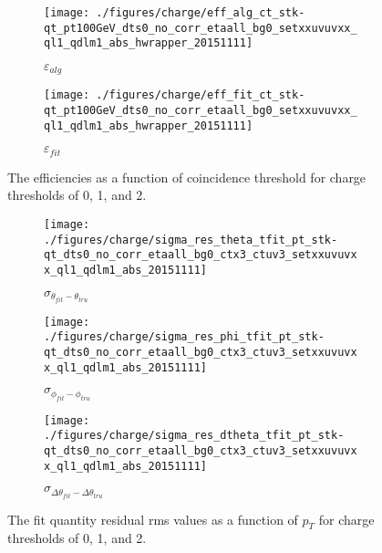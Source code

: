\begin{figure}[!htbp]\captionsetup{justification=centering}
  \begin{center}
    \begin{subfigure}{0.45\textwidth}\caption{$\varepsilon_{alg}$}\texttt{[image: ./figures/charge/eff\_alg\_ct\_stk-qt\_pt100GeV\_dts0\_no\_corr\_etaall\_bg0\_setxxuvuvxx\_ql1\_qdlm1\_abs\_hwrapper\_20151111]}\end{subfigure}
    \begin{subfigure}{0.45\textwidth}\caption{$\varepsilon_{fit}$}\texttt{[image: ./figures/charge/eff\_fit\_ct\_stk-qt\_pt100GeV\_dts0\_no\_corr\_etaall\_bg0\_setxxuvuvxx\_ql1\_qdlm1\_abs\_hwrapper\_20151111]}\end{subfigure}
  \caption{\label{fig:effqt} The efficiencies as a function of coincidence threshold for charge thresholds of 0, 1, and 2.}
  \end{center}
\end{figure}

\begin{figure}[!htbp]\captionsetup{justification=centering}
  \begin{center}
    \begin{subfigure}{0.32\textwidth}\caption{$\sigma_{\theta_{fit}-\theta_{tru}}$}\texttt{[image: ./figures/charge/sigma\_res\_theta\_tfit\_pt\_stk-qt\_dts0\_no\_corr\_etaall\_bg0\_ctx3\_ctuv3\_setxxuvuvxx\_ql1\_qdlm1\_abs\_20151111]}\end{subfigure}
    \begin{subfigure}{0.32\textwidth}\caption{$\sigma_{\phi_{fit}-\phi_{tru}}$}\texttt{[image: ./figures/charge/sigma\_res\_phi\_tfit\_pt\_stk-qt\_dts0\_no\_corr\_etaall\_bg0\_ctx3\_ctuv3\_setxxuvuvxx\_ql1\_qdlm1\_abs\_20151111]}\end{subfigure}
    \begin{subfigure}{0.32\textwidth}\caption{$\sigma_{\Delta\theta_{fit}-\Delta\theta_{tru}}$}\texttt{[image: ./figures/charge/sigma\_res\_dtheta\_tfit\_pt\_stk-qt\_dts0\_no\_corr\_etaall\_bg0\_ctx3\_ctuv3\_setxxuvuvxx\_ql1\_qdlm1\_abs\_20151111]}\end{subfigure}
  \caption{\label{fig:resqt} The fit quantity residual rms values as a function of $p_T$ for charge thresholds of 0, 1, and 2.}
  \end{center}
\end{figure}
\clearpage
